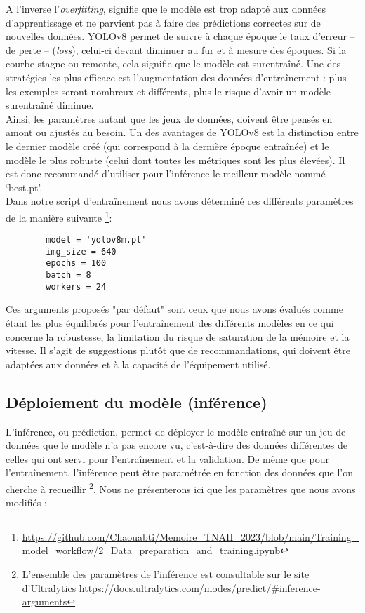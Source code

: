 \documentclass[12pt,twoside]{book}
\begin{document}
\newpage
A l’inverse l’\textit{overfitting}, signifie que le modèle est trop adapté aux données d'apprentissage et ne parvient pas à faire des prédictions correctes sur de nouvelles données. YOLOv8 permet de suivre à chaque époque le taux d’erreur -- de perte -- (\textit{loss}), celui-ci devant diminuer au fur et à mesure des époques. Si la courbe stagne ou remonte, cela signifie que le modèle est surentraîné. Une des stratégies les plus efficace est l’augmentation des données d’entraînement : plus les exemples seront nombreux et différents, plus le risque d’avoir un modèle surentraîné diminue. \\

Ainsi, les paramètres autant que les jeux de données, doivent être pensés en amont ou ajustés au besoin. Un des avantages de YOLOv8 est la distinction entre le dernier modèle créé (qui correspond à la dernière époque entraînée) et le modèle le plus robuste (celui dont toutes les métriques sont les plus élevées). Il est donc recommandé d’utiliser pour l’inférence le meilleur modèle nommé ‘best.pt’. \\

Dans notre script d’entraînement nous avons déterminé ces différents paramètres de la manière suivante \footnote{\url{https://github.com/Chaouabti/Memoire\_TNAH\_2023/blob/main/Training\_model\_workflow/2\_Data\_preparation\_and\_training.ipynb}}:
\begin{center}
    \begin{verbatim}
        model = 'yolov8m.pt'
        img_size = 640 
        epochs = 100 
        batch = 8 
        workers = 24 
    \end{verbatim}
\end{center}

Ces arguments proposés "par défaut" sont ceux que nous avons évalués comme étant les plus équilibrés pour l'entraînement des différents modèles en ce qui concerne la robustesse, la limitation du risque de saturation de la mémoire et la vitesse. Il s'agit de suggestions plutôt que de recommandations, qui doivent être adaptées aux données et à la capacité de l'équipement utilisé.

\newpage
\subsection{Déploiement du modèle (inférence)}

L’inférence, ou prédiction, permet de déployer le modèle entraîné sur un jeu  de données que le modèle n’a pas encore vu, c’est-à-dire des données différentes de celles qui ont servi pour l’entraînement et la validation. De même que pour l’entraînement, l’inférence peut être paramétrée en fonction des données que l’on cherche à recueillir \footnote{L’ensemble des paramètres de l’inférence est consultable sur le site d’Ultralytics \url{https://docs.ultralytics.com/modes/predict/\#inference-arguments}}. Nous ne présenterons ici que les paramètres que nous avons modifiés :\\
\end{document}
